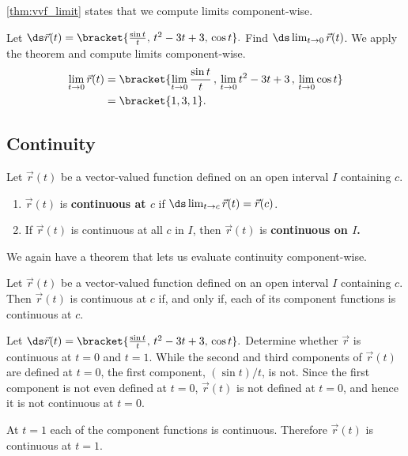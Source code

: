 \autoref{thm:vvf_limit} states that we compute limits component-wise.

\begin{example}\label{ex_vvflimit1}
Let $\ds\vec r(t) =\bracket{\frac{\sin t}{t},\, t^2-3t+3,\,\cos t}.$ Find $\ds \lim_{t\to 0}\vec r(t)$.
\solution
We apply the theorem and compute limits component-wise.
\begin{align*}
\lim_{t\to0} \vec r(t) &=\bracket{\lim_{t\to 0}\frac{\sin t}{t}\, , \, \lim_{t\to 0} t^2-3t+3\, , \, \lim_{t\to 0} \cos t}\\
			&=\bracket{1,3,1}.
\end{align*}
\end{example}

\subsection{Continuity}

\begin{definition}\label{def:vvf_continuity}
Let $\vec r(t)$ be a vector-valued function defined on an open interval $I$ containing $c$.
\begin{enumerate}
	\item $\vec r(t)$ is \textbf{continuous at $c$} if $\ds \lim_{t\to c} \vec r(t) = \vec r(c)$.
	\item	If $\vec r(t)$ is continuous at all $c$ in $I$, then $\vec r(t)$ is \textbf{continuous on $I$.}
\end{enumerate}
\end{definition}

We again have a theorem that lets us evaluate continuity component-wise.

\begin{theorem}\label{thm:vvf_continuity}
Let $\vec r(t)$ be a vector-valued function defined on an open interval $I$ containing $c$. Then $\vec r(t)$ is continuous at $c$ if, and only if, each of its component functions is continuous at $c$.
\end{theorem}

\begin{example}\label{ex_vvflimit2}
Let $\ds\vec r(t) =\bracket{\frac{\sin t}{t},\, t^2-3t+3,\,\cos t}.$ Determine whether $\vec r$ is continuous at $t=0$ and $t=1$.
\solution
While the second and third components of $\vec r(t)$ are defined at $t=0$, the first component, $(\sin t)/t$, is not. Since the first component is not even defined at $t=0$, $\vec r(t)$ is not defined at $t=0$, and hence it is not continuous at $t=0$.

At $t=1$ each of the component functions is continuous. Therefore $\vec r(t)$ is continuous at $t=1$.
\end{example}

